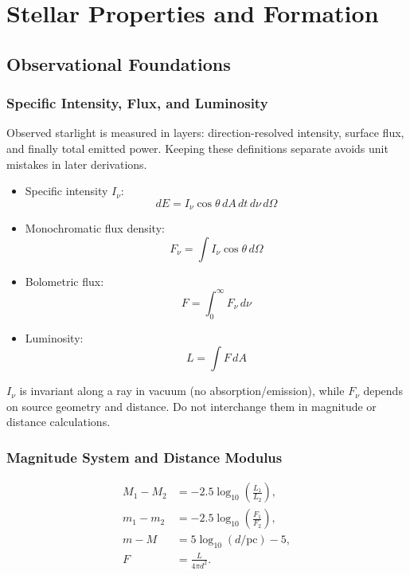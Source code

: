 \chapter{Stellar Properties and Formation}

\section{Observational Foundations}

\subsection{Specific Intensity, Flux, and Luminosity}
\begin{intuition}
Observed starlight is measured in layers: direction-resolved intensity, surface flux, and finally total emitted power.
Keeping these definitions separate avoids unit mistakes in later derivations.
\end{intuition}

\begin{theory}
\begin{itemize}
    \item Specific intensity $I_\nu$:
    \begin{equation}
        dE = I_\nu \cos\theta \, dA \, dt \, d\nu \, d\Omega
    \end{equation}
    \item Monochromatic flux density:
    \begin{equation}
        F_\nu = \int I_\nu \cos\theta \, d\Omega
    \end{equation}
    \item Bolometric flux:
    \begin{equation}
        F = \int_0^\infty F_\nu \, d\nu
    \end{equation}
    \item Luminosity:
    \begin{equation}
        L = \int F \, dA
    \end{equation}
\end{itemize}
\end{theory}

\begin{importantnote}
$I_\nu$ is invariant along a ray in vacuum (no absorption/emission), while $F_\nu$ depends on source geometry and distance.
Do not interchange them in magnitude or distance calculations.
\end{importantnote}

\subsection{Magnitude System and Distance Modulus}
\begin{theory}
\begin{align}
    M_1 - M_2 &= -2.5 \log_{10}\left(\frac{L_1}{L_2}\right), \\
    m_1 - m_2 &= -2.5 \log_{10}\left(\frac{F_1}{F_2}\right), \\
    m - M &= 5 \log_{10}(d/\text{pc}) - 5, \\
    F &= \frac{L}{4\pi d^2}.
\end{align}
\end{theory}

